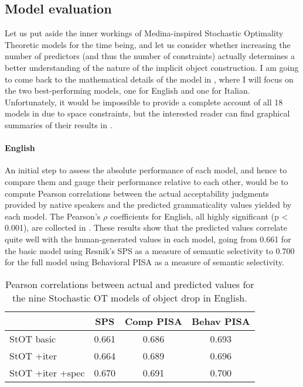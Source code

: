 

\subsection{Model evaluation} 

Let us put aside the inner workings of Medina-inspired Stochastic Optimality Theoretic models for the time being, and let us consider whether increasing the number of predictors (and thus the number of constraints) actually determines a better understanding of the nature of the implicit object construction. I am going to come back to the mathematical details of the model in , where I will focus on the two best-performing models, one for English and one for Italian. Unfortunately, it would be impossible to provide a complete account of all 18 models in  due to space constraints, but the interested reader can find graphical summaries of their results in .

\paragraph{English} An initial step to assess the absolute performance of each model, and hence to compare them and gauge their performance relative to each other, would be to compute Pearson correlations between the actual acceptability judgments provided by native speakers and the predicted grammaticality values yielded by each model. The Pearson's $\rho$ coefficients for English, all highly significant (p < 0.001), are collected in . These results show that the predicted values correlate quite well with the human-generated values in each model, going from 0.661 for the basic model using Resnik's SPS as a measure of semantic selectivity to 0.700 for the full model using Behavioral PISA as a measure of semantic selectivity.

\begin{table}[htb] %
\caption{Pearson correlations between actual and predicted values for the nine Stochastic OT models of object drop in English.}
\begin{tabular}{l|ccc}
& SPS & Comp PISA & Behav PISA \\
\hline
StOT basic           & 0.661        & 0.686     & 0.693      \\
StOT +iter           & 0.664        & 0.689     & 0.696      \\
StOT +iter +spec     & 0.670        & 0.691     & 0.700     
\end{tabular}
\end{table}

